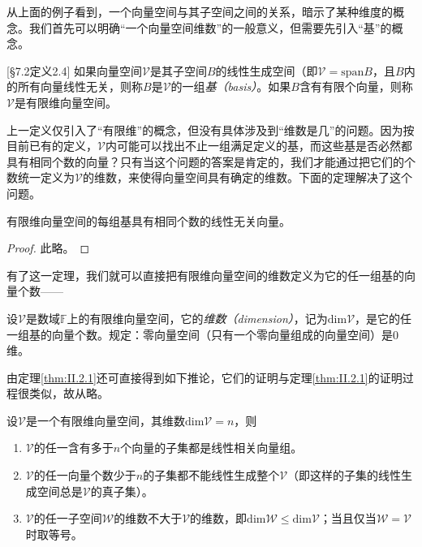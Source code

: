 \documentclass[../main.tex]{subfiles}
\begin{document}
从上面的例子看到，一个向量空间与其子空间之间的关系，暗示了某种维度的概念。我们首先可以明确“一个向量空间维数”的一般意义，但需要先引入“基”的概念。

\begin{definition}[向量空间的基]\label{def:II.2.5}\cite{周胜林2012线性代数}[\S 7.2定义2.4]
    如果向量空间$\mathcal{V}$是其子空间$B$的线性生成空间（即$\mathcal{V}=\mathrm{span}B$，且$B$内的所有向量线性无关，则称$B$是$\mathcal{V}$的一组\emph{基（basis）}。如果$B$含有有限个向量，则称$\mathcal{V}$是有限维向量空间。
\end{definition}

上一定义仅引入了“有限维”的概念，但没有具体涉及到“维数是几”的问题。因为按目前已有的定义，$\mathcal{V}$内可能可以找出不止一组满足定义的基，而这些基是否必然都具有相同个数的向量？只有当这个问题的答案是肯定的，我们才能通过把它们的个数统一定义为$\mathcal{V}$的维数，来使得向量空间具有确定的维数。下面的定理解决了这个问题。

\begin{theorem}\label{thm:II.2.1}
    有限维向量空间的每组基具有相同个数的线性无关向量。
\end{theorem}
\begin{proof}
    此略\cite[“(3)的证明”，p.~171]{周胜林2012线性代数}\cite[\S 2.3,Theorem 4,p.~44]{Hoffman1971}。
\end{proof}

有了这一定理，我们就可以直接把有限维向量空间的维数定义为它的任一组基的向量个数——

\begin{definition}[有限维向量空间的维数]\label{def:II.2.6}
    设$\mathcal{V}$是数域$\mathbb{F}$上的有限维向量空间，它的\emph{维数（dimension）}，记为$\mathrm{dim}\mathcal{V}$，是它的任一组基的向量个数。规定：零向量空间（只有一个零向量组成的向量空间）是0维。
\end{definition}

由定理\ref{thm:II.2.1}还可直接得到如下推论，它们的证明与定理\ref{thm:II.2.1}的证明过程很类似，故从略。

\begin{corollary}
    设$\mathcal{V}$是一个有限维向量空间，其维数$\mathrm{dim}\mathcal{V}=n$，则
    \begin{enumerate}
        \item $\mathcal{V}$的任一含有多于$n$个向量的子集都是线性相关向量组。
        \item $\mathcal{V}$的任一向量个数少于$n$的子集都不能线性生成整个$\mathcal{V}$（即这样的子集的线性生成空间总是$\mathcal{V}$的真子集）。
        \item $\mathcal{V}$的任一子空间$\mathcal{W}$的维数不大于$\mathcal{V}$的维数，即$\mathrm{dim}\mathcal{W}\leq\mathrm{dim}\mathcal{V}$；当且仅当$\mathcal{W}=\mathcal{V}$时取等号。
    \end{enumerate}
\end{corollary}
\end{document}
